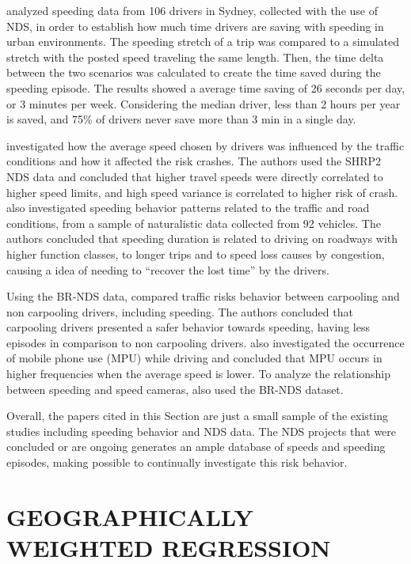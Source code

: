 \textcite{Ellison2015} analyzed speeding data from 106 drivers in Sydney, collected with the use of NDS, in order to establish how much time drivers are saving with speeding in urban environments. The speeding stretch of a trip was compared to a simulated stretch with the posted speed traveling the same length. Then, the time delta between the two scenarios was calculated to create the time saved during the speeding episode. The results showed a average time saving of 26 seconds per day, or 3 minutes per week. Considering the median driver, less than 2 hours per year is saved, and 75\% of drivers never save more than 3 min in a single day. 

\textcite{Hamzeie2017} investigated how the average speed chosen by drivers was influenced by the traffic conditions and how it affected the risk crashes. The authors used the SHRP2 NDS data and concluded that higher travel speeds were directly correlated to higher speed limits, and high speed variance is correlated to higher risk of crash. \textcite{Kong2020} also investigated speeding behavior patterns related to the traffic and road conditions, from a sample of naturalistic data collected from 92 vehicles. The authors concluded that speeding duration is related to driving on roadways with higher function classes, to longer trips and to speed loss causes by congestion, causing a idea of needing to ``recover the lost time'' by the drivers.

Using the BR-NDS data, \textcite{Bastos2021} compared traffic risks behavior between carpooling and non carpooling drivers, including speeding. The authors concluded that carpooling drivers presented a safer behavior towards speeding, having less episodes in comparison to non carpooling drivers. \textcite{Bastos2020a} also investigated the occurrence of mobile phone use (MPU) while driving and concluded that MPU occurs in higher frequencies when the average speed is lower. To analyze the relationship between speeding and speed cameras, \textcite{Amancio2021} also used the BR-NDS dataset. 

Overall, the papers cited in this Section are just a small sample of the existing studies including speeding behavior and NDS data. The NDS projects that were concluded or are ongoing generates an ample database of speeds and speeding episodes, making possible to continually investigate this risk behavior. 

\section{GEOGRAPHICALLY WEIGHTED REGRESSION} \label{sec:gwr}

